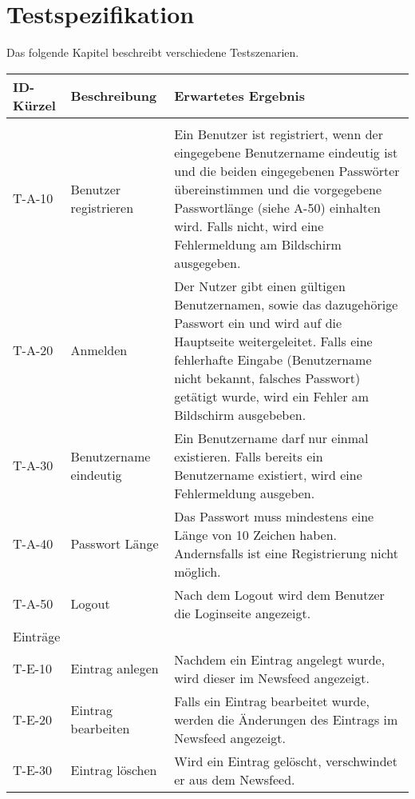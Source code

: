 
\chapter{Testspezifikation}
Das folgende Kapitel beschreibt verschiedene Testszenarien.



\begin{tabularx}{\textwidth}{|l|X|X|}
    \toprule
    \textbf{ID-Kürzel} & \textbf{Beschreibung} & \textbf{Erwartetes Ergebnis} \\
    \midrule
    \endhead
    \hline
    \caption{Testspezifikationen}
    
    \endfoot
    \multicolumn{3}{|l|}{Authentifizierung}\\ \hline
    T-A-10 & Benutzer registrieren & Ein Benutzer ist registriert, wenn der eingegebene Benutzername eindeutig ist und die beiden eingegebenen Passwörter übereinstimmen und die vorgegebene Passwortlänge (siehe A-50) einhalten wird. Falls nicht, wird eine Fehlermeldung am Bildschirm ausgegeben. \\ \hline
    T-A-20 & Anmelden &  Der Nutzer gibt einen gültigen Benutzernamen, sowie das dazugehörige Passwort ein und wird auf die Hauptseite weitergeleitet. \newline Falls eine fehlerhafte Eingabe (Benutzername nicht bekannt, falsches Passwort) getätigt wurde, wird ein Fehler am Bildschirm ausgebeben.\\ \hline
    T-A-30 & Benutzername eindeutig & Ein Benutzername darf nur einmal existieren. Falls bereits ein Benutzername existiert, wird eine Fehlermeldung ausgeben.\\ \hline
    T-A-40 & Passwort Länge & Das Passwort muss mindestens eine Länge von 10 Zeichen haben. Andernsfalls ist eine Registrierung nicht möglich.  \\\hline
    T-A-50 & Logout & Nach dem Logout wird dem Benutzer die Loginseite angezeigt.\\ \hline
    \multicolumn{3}{|l|}{Einträge}\\ \hline
    T-E-10 & Eintrag anlegen &  Nachdem ein Eintrag angelegt wurde, wird dieser im Newsfeed angezeigt. \\\hline
   	T-E-20 & Eintrag bearbeiten & Falls ein Eintrag bearbeitet wurde, werden die Änderungen des Eintrags im Newsfeed angezeigt. \\\hline
    T-E-30 & Eintrag löschen &  Wird ein Eintrag gelöscht, verschwindet er aus dem Newsfeed.\\\hline

\end{tabularx}
